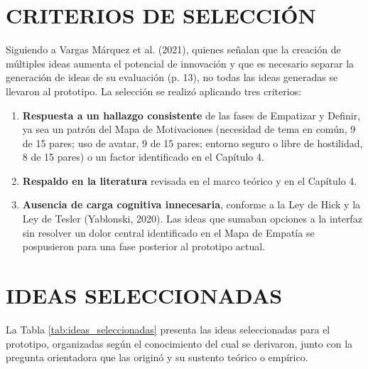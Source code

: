 \section{CRITERIOS DE SELECCIÓN}
Siguiendo a Vargas Márquez et al. (2021), quienes señalan que la creación de múltiples ideas aumenta el potencial de innovación y que es necesario separar la generación de ideas de su evaluación (p. 13), no todas las ideas generadas se llevaron al prototipo. La selección se realizó aplicando tres criterios:

\begin{enumerate}
    \item \textbf{Respuesta a un hallazgo consistente} de las fases de Empatizar y Definir, ya sea un patrón del Mapa de Motivaciones (necesidad de tema en común, 9 de 15 pares; uso de avatar, 9 de 15 pares; entorno seguro o libre de hostilidad, 8 de 15 pares) o un factor identificado en el Capítulo 4.
    \item \textbf{Respaldo en la literatura} revisada en el marco teórico y en el Capítulo 4.
    \item \textbf{Ausencia de carga cognitiva innecesaria}, conforme a la Ley de Hick y la Ley de Tesler (Yablonski, 2020). Las ideas que sumaban opciones a la interfaz sin resolver un dolor central identificado en el Mapa de Empatía se pospusieron para una fase posterior al prototipo actual.
\end{enumerate}

\section{IDEAS SELECCIONADAS}
La Tabla \ref{tab:ideas_seleccionadas} presenta las ideas seleccionadas para el prototipo, organizadas según el conocimiento del cual se derivaron, junto con la pregunta orientadora que las originó y su sustento teórico o empírico.

